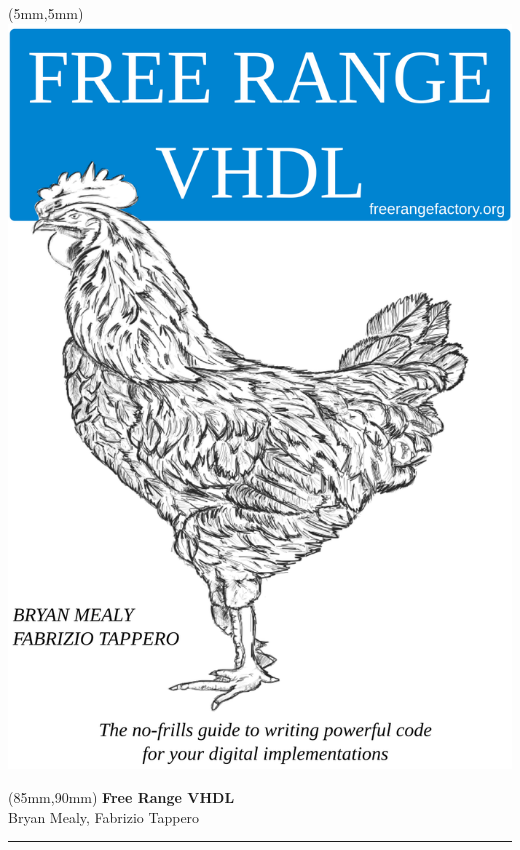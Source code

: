 \documentclass[11pt,b5paper]{book}
\begin{document}
	\thispagestyle{empty}
	\begin{textblock*}{160mm}(5mm,5mm)
	\includegraphics[width=160mm]{pics/cover.png}  %
	\end{textblock*}
	\null\newpage %

	\thispagestyle{empty}
	\null\newpage

	\thispagestyle{empty}
	\begin{textblock*}{60mm}(85mm,90mm)
	\noindent
	{\sffamily\huge\bfseries Free Range VHDL}\\
	\noindent
	{\sffamily Bryan Mealy, Fabrizio Tappero}\\
	{\color{dark-gray}\rule[5pt]{190pt}{4pt}}
	\end{textblock*}
	\null\newpage
\end{document}
